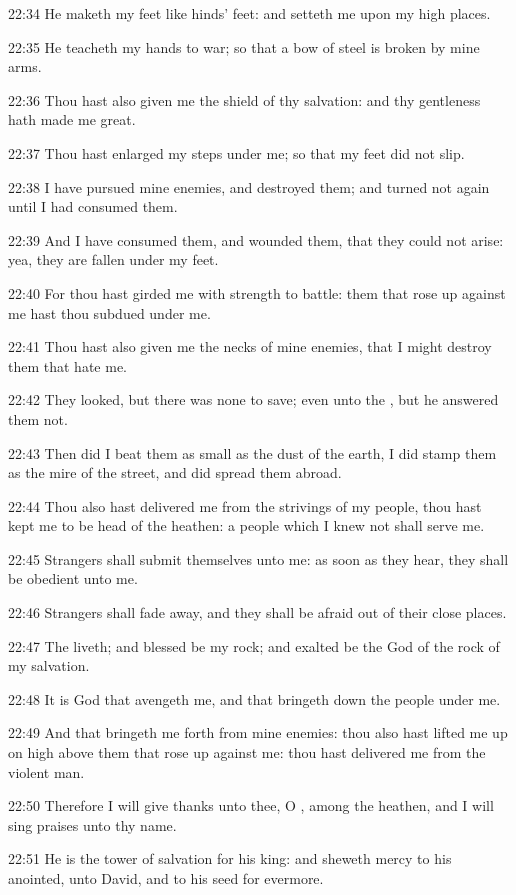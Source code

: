 22:34 He maketh my feet like hinds' feet: and setteth me upon my high places.

22:35 He teacheth my hands to war; so that a bow of steel is broken by mine arms.

22:36 Thou hast also given me the shield of thy salvation: and thy gentleness hath made me great.

22:37 Thou hast enlarged my steps under me; so that my feet did not slip.

22:38 I have pursued mine enemies, and destroyed them; and turned not again until I had consumed them.

22:39 And I have consumed them, and wounded them, that they could not arise: yea, they are fallen under my feet.

22:40 For thou hast girded me with strength to battle: them that rose up against me hast thou subdued under me.

22:41 Thou hast also given me the necks of mine enemies, that I might destroy them that hate me.

22:42 They looked, but there was none to save; even unto the \LORD, but he answered them not.

22:43 Then did I beat them as small as the dust of the earth, I did stamp them as the mire of the street, and did spread them abroad.

22:44 Thou also hast delivered me from the strivings of my people, thou hast kept me to be head of the heathen: a people which I knew not shall serve me.

22:45 Strangers shall submit themselves unto me: as soon as they hear, they shall be obedient unto me.

22:46 Strangers shall fade away, and they shall be afraid out of their close places.

22:47 The \LORD liveth; and blessed be my rock; and exalted be the God of the rock of my salvation.

22:48 It is God that avengeth me, and that bringeth down the people under me.

22:49 And that bringeth me forth from mine enemies: thou also hast lifted me up on high above them that rose up against me: thou hast delivered me from the violent man.

22:50 Therefore I will give thanks unto thee, O \LORD, among the heathen, and I will sing praises unto thy name.

22:51 He is the tower of salvation for his king: and sheweth mercy to his anointed, unto David, and to his seed for evermore.


